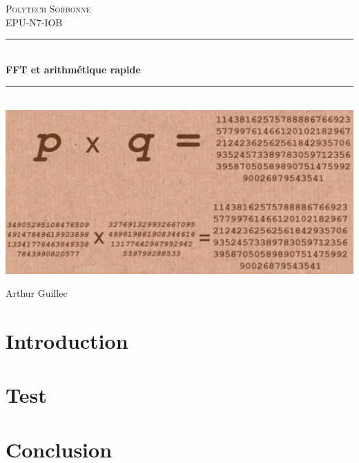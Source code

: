 \documentclass{article}
\title{}
\author{}
\date{}
\title{}
\author{}
\date{}
\newcommand{\HRule}{\rule{\linewidth}{0.5mm}}
\begin{document}
\begin{titlepage}
  \begin{sffamily}
  \begin{center}


    \textsc{\LARGE Polytech Sorbonne}\\[2cm]

    \textsc{\Large EPU-N7-IOB}\\[1.5cm]

    \HRule \\[0.4cm]
    { \huge \bfseries FFT et arithmétique rapide\\[0.4cm] }

    \HRule \\[2cm]
    \includegraphics[scale=0.35]{assets/img/rsa.jpeg}
    \\[2cm]

    \vfill
    \begin{minipage}{0.4\textwidth}
      \begin{center} \large
        Arthur Guillec\\
      \end{center}
    \end{minipage}
    \vfill

  \end{center}
  \end{sffamily}
\end{titlepage}


\section{Introduction}

\section{Test}

\section{Conclusion}
\end{document}
